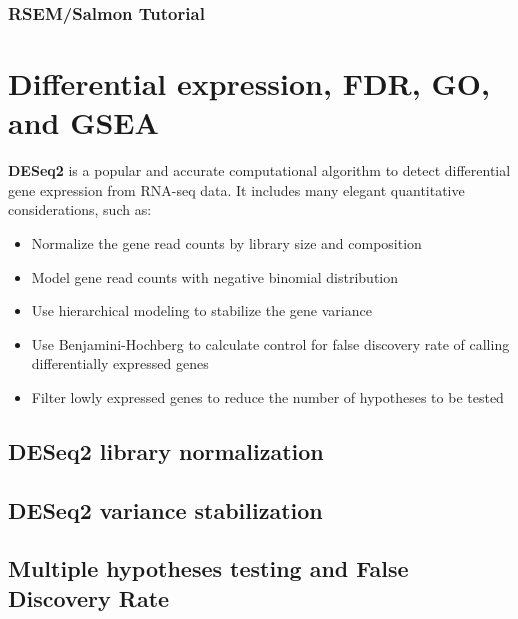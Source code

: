 \documentclass[
]{book}
\providecommand{\tightlist}{%
  \setlength{\itemsep}{0pt}\setlength{\parskip}{0pt}}
\begin{document}
\hypertarget{rsemsalmon-tutorial}{%
\subsection{RSEM/Salmon Tutorial}\label{rsemsalmon-tutorial}}

\hypertarget{de}{%
\chapter{Differential expression, FDR, GO, and GSEA}\label{de}}

\textbf{DESeq2} is a popular and accurate computational algorithm to detect differential gene expression from RNA-seq data. It includes many elegant quantitative considerations, such as:

\begin{itemize}
\tightlist
\item
  Normalize the gene read counts by library size and composition\\
\item
  Model gene read counts with negative binomial distribution\\
\item
  Use hierarchical modeling to stabilize the gene variance\\
\item
  Use Benjamini-Hochberg to calculate control for false discovery rate of calling differentially expressed genes\\
\item
  Filter lowly expressed genes to reduce the number of hypotheses to be tested
\end{itemize}

\hypertarget{deseq2-library-normalization}{%
\section{DESeq2 library normalization}\label{deseq2-library-normalization}}

\hypertarget{deseq2-variance-stabilization}{%
\section{DESeq2 variance stabilization}\label{deseq2-variance-stabilization}}

\hypertarget{multiple-hypotheses-testing-and-false-discovery-rate}{%
\section{Multiple hypotheses testing and False Discovery Rate}\label{multiple-hypotheses-testing-and-false-discovery-rate}}
\end{document}
